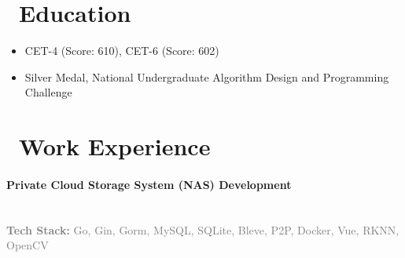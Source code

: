 \documentclass{resume}
\begin{document}
\section{\faGraduationCap\ Education}
\begin{itemize}
\item CET-4 (Score: 610), CET-6 (Score: 602)
\item Silver Medal, National Undergraduate Algorithm Design and Programming Challenge
\end{itemize}

\section{\faSuitcase\ Work Experience}

\paragraph*{Private Cloud Storage System (NAS) Development}\mbox{}\\
{\small
\noindent\textcolor{gray}{\textbf{Tech Stack:} Go, Gin, Gorm, MySQL, SQLite, Bleve, P2P, Docker, Vue, RKNN, OpenCV}
}
\vspace{0.3ex}
\vspace{0.3ex}
\end{document}

